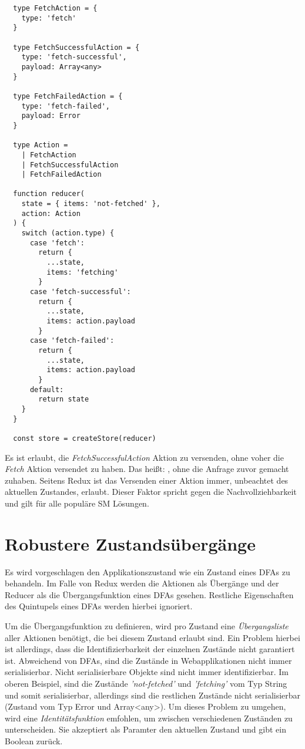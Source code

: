 \begin{lstlisting}
  type FetchAction = {
    type: 'fetch'
  }

  type FetchSuccessfulAction = {
    type: 'fetch-successful',
    payload: Array<any>
  }

  type FetchFailedAction = {
    type: 'fetch-failed',
    payload: Error
  }

  type Action =
    | FetchAction
    | FetchSuccessfulAction
    | FetchFailedAction

  function reducer(
    state = { items: 'not-fetched' }, 
    action: Action
  ) {
    switch (action.type) {
      case 'fetch':
        return {
          ...state,
          items: 'fetching'
        }
      case 'fetch-successful':
        return {
          ...state,
          items: action.payload
        }
      case 'fetch-failed':
        return {
          ...state,
          items: action.payload
        }
      default:
        return state
    }
  }
  
  const store = createStore(reducer)
\end{lstlisting}

Es ist erlaubt, die \textit{FetchSuccessfulAction} Aktion zu versenden, ohne voher die \textit{Fetch} Aktion versendet zu haben. Das heißt: , ohne die Anfrage zuvor gemacht zuhaben. Seitens Redux ist das Versenden einer Aktion immer, unbeachtet des aktuellen Zustandes, erlaubt. Dieser Faktor spricht gegen die Nachvollziehbarkeit und gilt für alle populäre SM Lösungen.

\section {Robustere Zustandsübergänge}



Es wird vorgeschlagen den Applikationszustand wie ein Zustand eines DFAs zu behandeln. Im Falle von Redux werden die Aktionen als Übergänge und der Reducer als die Übergangsfunktion eines DFAs gesehen. Restliche Eigenschaften des Quintupels eines DFAs werden hierbei ignoriert.

Um die Übergangsfunktion zu definieren, wird pro Zustand eine \textit{Übergangsliste} aller Aktionen benötigt, die bei diesem Zustand erlaubt sind. Ein Problem hierbei ist allerdings, dass die Identifizierbarkeit der einzelnen Zustände nicht garantiert ist.
Abweichend von DFAs, sind die Zustände in Webapplikationen nicht immer serialisierbar. Nicht serialisierbare Objekte sind nicht immer identifizierbar. Im oberen Beispiel, sind die Zustände \textit{'not-fetched'} und \textit{'fetching'} vom Typ String und somit serialisierbar, allerdings sind die restlichen Zustände nicht serialisierbar (Zustand vom Typ Error und Array<any>). Um dieses Problem zu umgehen, wird eine \textit{Identitätsfunktion} emfohlen, um zwischen verschiedenen Zuständen zu unterscheiden. Sie akzeptiert als Paramter den aktuellen Zustand und gibt ein Boolean zurück.

